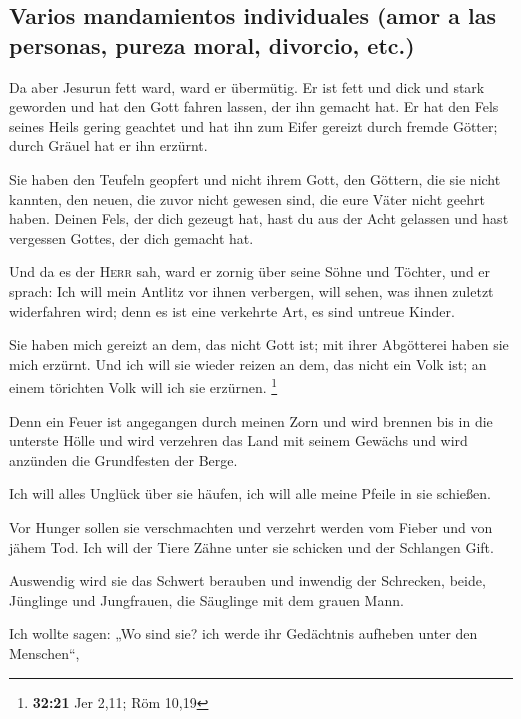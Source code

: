 \hypertarget{varios-mandamientos-individuales-amor-a-las-personas-pureza-moral-divorcio-etc.}{%
\subsection{Varios mandamientos individuales (amor a las personas,
pureza moral, divorcio,
etc.)}\label{varios-mandamientos-individuales-amor-a-las-personas-pureza-moral-divorcio-etc.}}

 Da aber Jesurun fett ward, ward er übermütig. Er ist
fett und dick und stark geworden und hat den Gott fahren lassen, der ihn
gemacht hat. Er hat den Fels seines Heils gering geachtet
 und hat ihn zum Eifer gereizt durch fremde Götter; durch
Gräuel hat er ihn erzürnt.

 Sie haben den Teufeln geopfert und nicht ihrem Gott, den
Göttern, die sie nicht kannten, den neuen, die zuvor nicht gewesen sind,
die eure Väter nicht geehrt haben.  Deinen Fels, der dich
gezeugt hat, hast du aus der Acht gelassen und hast vergessen Gottes,
der dich gemacht hat.

 Und da es der \textsc{Herr} sah, ward er zornig über
seine Söhne und Töchter,  und er sprach: Ich will mein
Antlitz vor ihnen verbergen, will sehen, was ihnen zuletzt widerfahren
wird; denn es ist eine verkehrte Art, es sind untreue Kinder.

 Sie haben mich gereizt an dem, das nicht Gott ist; mit
ihrer Abgötterei haben sie mich erzürnt. Und ich will sie wieder reizen
an dem, das nicht ein Volk ist; an einem törichten Volk will ich sie
erzürnen. \footnote{\textbf{32:21} Jer 2,11; Röm 10,19}

 Denn ein Feuer ist angegangen durch meinen Zorn und wird
brennen bis in die unterste Hölle und wird verzehren das Land mit seinem
Gewächs und wird anzünden die Grundfesten der Berge.

 Ich will alles Unglück über sie häufen, ich will alle
meine Pfeile in sie schießen.

 Vor Hunger sollen sie verschmachten und verzehrt werden
vom Fieber und von jähem Tod. Ich will der Tiere Zähne unter sie
schicken und der Schlangen Gift.

 Auswendig wird sie das Schwert berauben und inwendig der
Schrecken, beide, Jünglinge und Jungfrauen, die Säuglinge mit dem grauen
Mann.

 Ich wollte sagen: „Wo sind sie? ich werde ihr Gedächtnis
aufheben unter den Menschen``,

